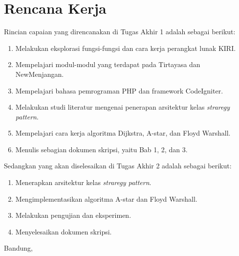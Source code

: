 \documentclass[a4paper,twoside]{article}
\begin{document}
	\section{Rencana Kerja}
	Rincian capaian yang direncanakan di Tugas Akhir 1 adalah sebagai berikut:
    	\begin{enumerate}
    		\item Melakukan eksplorasi fungsi-fungsi dan cara kerja perangkat lunak KIRI.
                \item Mempelajari modul-modul yang terdapat pada Tirtayasa dan NewMenjangan.
                \item Mempelajari bahasa pemrograman PHP dan framework CodeIgniter.
    		\item Melakukan studi literatur mengenai penerapan arsitektur kelas \textit{straregy pattern}.
    		\item Mempelajari cara kerja algoritma Dijkstra, A-star, dan Floyd Warshall.
                \item Menulis sebagian dokumen skripsi, yaitu Bab 1, 2, dan 3.
    	\end{enumerate}
	
	Sedangkan yang akan diselesaikan di Tugas Akhir 2 adalah sebagai berikut:
    	\begin{enumerate}
    		\item Menerapkan arsitektur kelas \textit{straregy pattern}.
    		\item Mengimplementasikan algoritma A-star dan Floyd Warshall.
    		\item Melakukan pengujian dan eksperimen.
    		\item Menyelesaikan dokumen skripsi.
    	\end{enumerate}
	
	\vspace{1cm}
	\centering Bandung, \tanggal\\
	\vspace{2cm} \nama \\ 
	\vspace{1cm}
	
\end{document}
